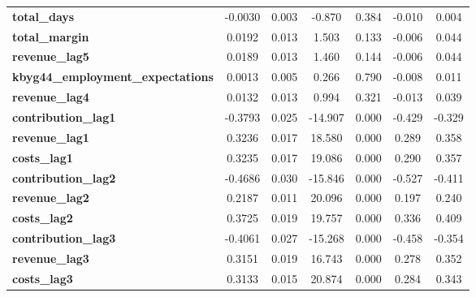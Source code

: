 \begin{center}
\begin{tabular}{lcccccc}
\textbf{total\_days}                      &      -0.0030  &        0.003     &    -0.870  &         0.384        &       -0.010    &        0.004     \\
\textbf{total\_margin}                    &       0.0192  &        0.013     &     1.503  &         0.133        &       -0.006    &        0.044     \\
\textbf{revenue\_lag5}                    &       0.0189  &        0.013     &     1.460  &         0.144        &       -0.006    &        0.044     \\
\textbf{kbyg44\_employment\_expectations} &       0.0013  &        0.005     &     0.266  &         0.790        &       -0.008    &        0.011     \\
\textbf{revenue\_lag4}                    &       0.0132  &        0.013     &     0.994  &         0.321        &       -0.013    &        0.039     \\
\textbf{contribution\_lag1}               &      -0.3793  &        0.025     &   -14.907  &         0.000        &       -0.429    &       -0.329     \\
\textbf{revenue\_lag1}                    &       0.3236  &        0.017     &    18.580  &         0.000        &        0.289    &        0.358     \\
\textbf{costs\_lag1}                      &       0.3235  &        0.017     &    19.086  &         0.000        &        0.290    &        0.357     \\
\textbf{contribution\_lag2}               &      -0.4686  &        0.030     &   -15.846  &         0.000        &       -0.527    &       -0.411     \\
\textbf{revenue\_lag2}                    &       0.2187  &        0.011     &    20.096  &         0.000        &        0.197    &        0.240     \\
\textbf{costs\_lag2}                      &       0.3725  &        0.019     &    19.757  &         0.000        &        0.336    &        0.409     \\
\textbf{contribution\_lag3}               &      -0.4061  &        0.027     &   -15.268  &         0.000        &       -0.458    &       -0.354     \\
\textbf{revenue\_lag3}                    &       0.3151  &        0.019     &    16.743  &         0.000        &        0.278    &        0.352     \\
\textbf{costs\_lag3}                      &       0.3133  &        0.015     &    20.874  &         0.000        &        0.284    &        0.343     \\

\end{tabular}
\end{center}
